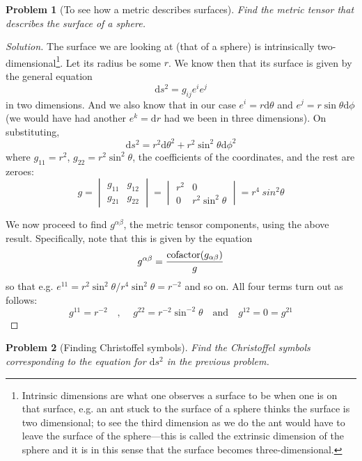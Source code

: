 \documentclass{tufte-handout}
\newtheorem{problem}{Problem}
\newenvironment{solution}
  {\begin{proof}[Solution]}
  {\end{proof}}
\newcommand{\dif}{\textrm{d}}
\providecommand*{\dif}[3][]{\frac{\textrm{d}^{#1}#2}{\textrm{d} #3^{#1}}}
\begin{document}
\begin{problem}[{\normalfont To see how a metric describes surfaces}]
	Find the metric tensor that describes the surface of a sphere.
\end{problem}

\begin{solution}
	The surface we are looking at (that of a sphere) is intrinsically two-dimensional\footnote{Intrinsic dimensions are what one observes a surface to be when one is on that surface, e.g. an ant stuck to the surface of a sphere thinks the surface is two dimensional; to see the third dimension as we do the ant would have to leave the surface of the sphere---this is called the extrinsic dimension of the sphere and it is in this sense that the surface becomes three-dimensional.}. Let its radius be some $r$. We know then that its surface is given by the general equation
	\[ \dif s^2 = g_{ij} e^ie^j \]
	in two dimensions. And we also know that in our case $e^i = r\dif\theta$ and $e^j = r\sin\theta\dif\phi$ (we would have had another $e^k = \dif r$ had we been in three dimensions). On substituting,
	\[ \dif s^2 = r^2 \dif \theta^2 + r^2 \sin^2\theta \dif \phi^2 \]
	where $g_{11} = r^2$, $g_{22} = r^2\sin^2\theta$, the coefficients of the coordinates, and the rest are zeroes:
	\[ g = \begin{vmatrix}
				g_{11} & g_{12} \\ g_{21} & g_{22}
			\end{vmatrix}
			= \begin{vmatrix}
					r^2 & 0 \\ 0 & r^2\sin^2\theta
				\end{vmatrix}
				= r^4 \ sin^2 \theta
			\]
			
\noindent We now proceed to find $g^{\alpha\beta}$, the metric tensor components, using the above result. Specifically, note that this is given by the equation
\[ g^{\alpha\beta} = {\textrm{cofactor}(g_{\alpha\beta}) \over g } \] so that e.g. $e^{11} = r^2\sin^2\theta / r^4 \sin^2\theta = r^{-2}$ and so on. All four terms turn out as follows:
\[ g^{11} = r^{-2} \quad \textrm{, } \quad g^{22} = r^{-2}\sin^{-2}\theta \quad \textrm{and} \quad g^{12} = 0 = g^{21}\]
\end{solution}

\begin{problem}[Finding Christoffel symbols]
	Find the Christoffel symbols corresponding to the equation for $\dif s^2$ in the previous problem.
\end{problem}
\end{document}
